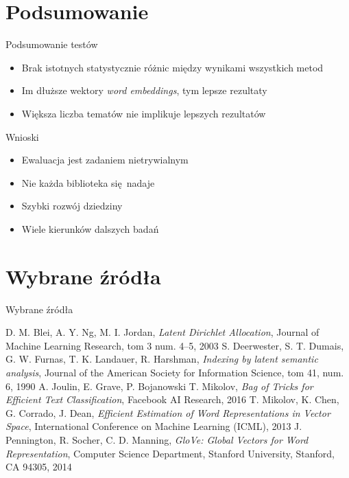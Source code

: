 \documentclass{beamer}
\begin{document}
	\section{Podsumowanie}
	\begin{frame}{Podsumowanie testów}
		\begin{itemize}
			\item Brak istotnych statystycznie różnic między wynikami wszystkich metod
			\item Im dłuższe wektory \emph{word embeddings}, tym lepsze rezultaty
			\item Większa liczba tematów nie implikuje lepszych rezultatów
		\end{itemize}
	\end{frame}
	\begin{frame}{Wnioski}
		\begin{itemize}
			\item Ewaluacja jest zadaniem nietrywialnym
			\item Nie każda biblioteka się nadaje
			\item Szybki rozwój dziedziny
			\item Wiele kierunków dalszych badań
		\end{itemize}
	\end{frame}
	\section{Wybrane źródła}
	\begin{frame}{Wybrane źródła}
		\begin{thebibliography}{30}
				D. M. Blei, A. Y. Ng, M. I. Jordan,
				\emph{Latent Dirichlet Allocation},
				Journal of Machine Learning Research, tom 3 num. 4–5,
				2003
				S. Deerwester, S. T. Dumais, G. W. Furnas, T. K. Landauer, R. Harshman,
				\emph{Indexing by latent semantic analysis},
				Journal of the American Society for Information Science, tom 41, num. 6,
				1990
				A. Joulin, E. Grave, P. Bojanowski T. Mikolov,
				\emph{Bag of Tricks for Efficient Text Classification},
				Facebook AI Research,
				2016
				T. Mikolov, K. Chen, G. Corrado, J. Dean,
				\emph{Efficient Estimation of Word Representations in Vector Space},
				International Conference on Machine Learning (ICML),
				2013
				J. Pennington, R. Socher, C. D. Manning,
				\emph{GloVe: Global Vectors for Word Representation},
				Computer Science Department, Stanford University, Stanford, CA 94305,
				2014
		\end{thebibliography}
	\end{frame}
\end{document}
